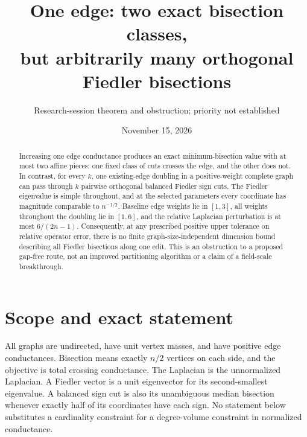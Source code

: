 \documentclass[11pt]{article}
\title{One edge: two exact bisection classes,\\but arbitrarily many orthogonal Fiedler bisections}
\author{Research-session theorem and obstruction; priority not established}
\date{November 15, 2026}
\begin{document}
\maketitle
\begin{abstract}
Increasing one edge conductance produces an exact minimum-bisection
value with at most two affine pieces: one fixed class of cuts crosses
the edge, and the other does not. In contrast, for every $k$, one
existing-edge doubling in a positive-weight complete graph can pass
through $k$ pairwise orthogonal balanced Fiedler sign cuts. The Fiedler
eigenvalue is simple throughout, and at the selected parameters every
coordinate has magnitude comparable to $n^{-1/2}$. Baseline edge weights
lie in $[1,3]$, all weights throughout the doubling lie in $[1,6]$, and
the relative Laplacian perturbation is at most $6/(2n-1)$.
Consequently, at any prescribed positive upper tolerance on relative
operator error, there is no finite graph-size-independent dimension
bound describing all Fiedler bisections along one edit.
This is an obstruction to a proposed gap-free route, not an improved
partitioning algorithm or a claim of a field-scale breakthrough.
\end{abstract}

\section*{Scope and exact statement}
All graphs are undirected, have unit vertex masses, and have positive
edge conductances. Bisection means exactly $n/2$ vertices on each side,
and the objective is total crossing conductance. The Laplacian is the
unnormalized Laplacian. A Fiedler vector is a unit eigenvector for its
second-smallest eigenvalue. A balanced sign cut is also its unambiguous
median bisection whenever exactly half of its coordinates have each sign.
No statement below substitutes a cardinality constraint for a
degree-volume constraint in normalized conductance.
\end{document}

